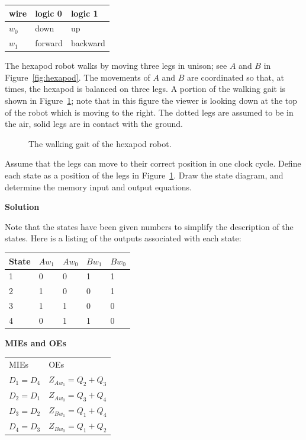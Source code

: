 \begin{enumerate}
\begin{tabular}{l|l|l}
wire   & logic 0 & logic 1	\\ \hline
$w_0$  & down	 & up		\\ \hline
$w_1$  & forward & backward	\\ 
\end{tabular}

The hexapod robot walks by moving three legs in unison; see $A$ and
$B$ in Figure~\ref{fig:hexapod}.  The movements of $A$ and $B$ are
coordinated so that, at times, the hexapod is balanced on three legs.
A portion of the walking gait is shown in Figure~\ref{fig:hexgate};
note that in this figure the viewer is looking down at the top of the 
robot which is moving to the right.  The dotted legs are assumed to be in
the air, solid legs are in contact with the ground.

\begin{figure}[ht]
\caption{The walking gait of the hexapod robot.}
\label{fig:hexgate}
\end{figure}

Assume that the legs can move to their correct position in one clock
cycle.  Define each state as a position of the legs in 
Figure~\ref{fig:hexgate}. Draw the state diagram,
and determine the memory input and output equations.

\begin{onlysolution}  \textbf{Solution} \itshape{

\begin{figure}[ht]
\end{figure}

Note that the states have been given numbers to simplify the
description of the states.  Here is a listing of the outputs 
associated with each state:

\begin{tabular}{l|l|l|l|l}
State  & $Aw_1$ & $Aw_0$ & $Bw_1$ & $Bw_0$  \\ \hline
1	& 0	& 0	 & 1	  & 1		\\ \hline
2	& 1	& 0	 & 0	  & 1		\\ \hline
3	& 1	& 1	 & 0	  & 0		\\ \hline
4	& 0	& 1	 & 1	  & 0		\\ 
\end{tabular}

\textbf{ MIEs and OEs}

\begin{tabular}{ll}
MIEs		&	OEs			\\
$D_1 = D_4$	&	$Z_{Aw_1} = Q_2 + Q_3$	\\
$D_2 = D_1$	&	$Z_{Aw_0} = Q_3 + Q_4$	\\
$D_3 = D_2$	&	$Z_{Bw_1} = Q_1 + Q_4$	\\
$D_4 = D_3$	&	$Z_{Bw_0} = Q_1 + Q_2$	\\
\end{tabular}

}
\end{onlysolution}
\end{enumerate}
